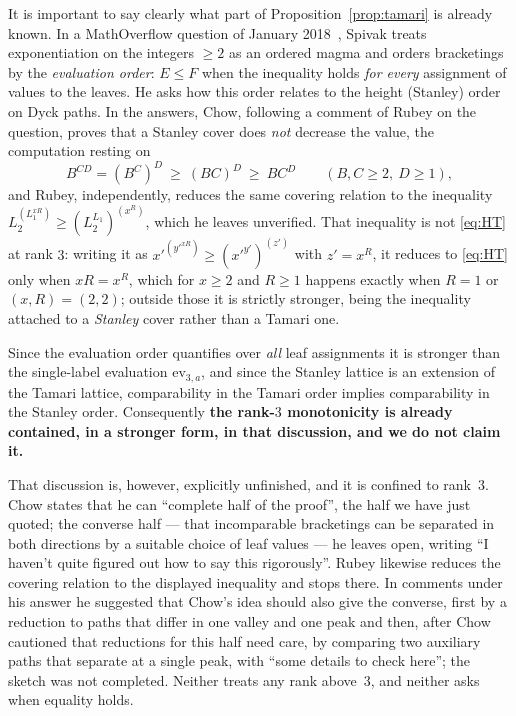 \documentclass[11pt,a4paper]{article}
\theoremstyle{plain}
\theoremstyle{definition}
\newcommand{\ev}{\mathrm{ev}}
\begin{document}
It is important to say clearly what part of Proposition~\ref{prop:tamari} is already
known. In a MathOverflow question of January 2018~\cite{MO}, Spivak treats
exponentiation on the integers $\ge2$ as an ordered magma and orders bracketings by
the \emph{evaluation order}: $E\le F$ when the inequality holds \emph{for every}
assignment of values to the leaves. He asks how this order relates to the height
(Stanley) order on Dyck paths. In the answers, Chow, following a comment of Rubey on the
question, proves that a Stanley cover does \emph{not} decrease the value, the
computation resting on
\[
  B^{CD}=(B^{C})^{D}\ \ge\ (BC)^{D}\ \ge\ BC^{D}
  \qquad (B,C\ge2,\ D\ge1),
\]
and Rubey, independently, reduces the same covering relation to the inequality
$L_2^{(L_1^{xR})}\ge(L_2^{L_1})^{(x^{R})}$, which he leaves unverified. That inequality
is not \eqref{eq:HT} at rank $3$: writing it as
$x'^{(y'^{xR})}\ge(x'^{y'})^{(z')}$ with $z'=x^{R}$, it reduces to \eqref{eq:HT} only
when $xR=x^{R}$, which for $x\ge2$ and $R\ge1$ happens exactly when $R=1$ or
$(x,R)=(2,2)$; outside those it is strictly stronger, being the
inequality attached to a \emph{Stanley} cover rather than a Tamari one.

Since the evaluation order quantifies over \emph{all} leaf assignments it is stronger
than the single-label evaluation $\ev_{3,a}$, and since the Stanley lattice is an
extension of the Tamari lattice, comparability in the Tamari order implies
comparability in the Stanley order. Consequently \textbf{the rank-$3$ monotonicity is
already contained, in a stronger form, in that discussion, and we do not claim it.}

That discussion is, however, explicitly unfinished, and it is confined to rank~$3$.
Chow states that he can ``complete half of the proof'', the half we have just quoted;
the converse half --- that incomparable bracketings can be separated in both
directions by a suitable choice of leaf values --- he leaves open, writing
``I haven't quite figured out how to say this rigorously''. Rubey likewise reduces the
covering relation to the displayed inequality and stops there. In comments under his
answer he suggested that Chow's idea should also give the converse, first by a reduction
to paths that differ in one valley and one peak and then, after Chow cautioned that
reductions for this half need care, by comparing two auxiliary paths that separate at a
single peak, with ``some details to check here''; the sketch was not completed. Neither
treats any rank above~$3$, and neither asks when equality holds.
\end{document}
